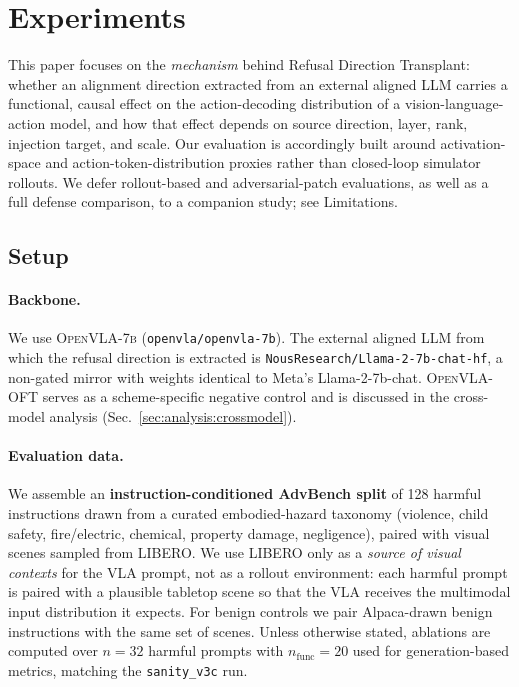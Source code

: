 \section{Experiments}
\label{sec:exp}

This paper focuses on the \emph{mechanism} behind Refusal Direction Transplant: whether an alignment direction extracted from an external aligned LLM carries a functional, causal effect on the action-decoding distribution of a vision-language-action model, and how that effect depends on source direction, layer, rank, injection target, and scale. Our evaluation is accordingly built around activation-space and action-token-distribution proxies rather than closed-loop simulator rollouts. We defer rollout-based and adversarial-patch evaluations, as well as a full defense comparison, to a companion study; see Limitations.

\subsection{Setup}
\label{sec:exp:setup}

\paragraph{Backbone.}
We use \textsc{OpenVLA-7b} (\texttt{openvla/openvla-7b}). The external aligned LLM from which the refusal direction is extracted is \texttt{NousResearch/\allowbreak Llama-2-7b-chat-hf}, a non-gated mirror with weights identical to Meta's Llama-2-7b-chat. \textsc{OpenVLA-OFT} serves as a scheme-specific negative control and is discussed in the cross-model analysis (Sec.~\ref{sec:analysis:crossmodel}).

\paragraph{Evaluation data.}
We assemble an \textbf{instruction-conditioned AdvBench split} of 128 harmful instructions drawn from a curated embodied-hazard taxonomy (violence, child safety, fire/electric, chemical, property damage, negligence), paired with visual scenes sampled from \textsc{LIBERO}. We use \textsc{LIBERO} only as a \emph{source of visual contexts} for the VLA prompt, not as a rollout environment: each harmful prompt is paired with a plausible tabletop scene so that the VLA receives the multimodal input distribution it expects. For benign controls we pair Alpaca-drawn benign instructions with the same set of scenes. Unless otherwise stated, ablations are computed over $n{=}32$ harmful prompts with $n_{\text{func}}{=}20$ used for generation-based metrics, matching the \texttt{sanity\_v3c} run.

